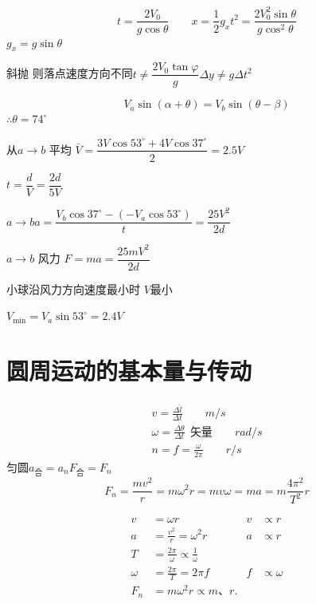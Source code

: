 \[ t=\frac{2V_0}{g\cos\theta}\qquad x=\frac12 g_xt^{2}=\frac{2V_0^{2}\sin\theta}{g\cos^{2}\theta} \]
$g_x=g\sin\theta$

斜抛 则落点速度方向不同\quad $t\neq\dfrac{2V_0\tan\varphi}{g}$\quad $\Delta y\neq g\Delta t^2$


\[
V_a\sin(\alpha+\theta)=V_b\sin(\theta-\beta)
\]
$\therefore\theta=74^\circ$

从$a\to b$ 平均 $\bar V=\dfrac{3V\cos53^\circ+4V\cos37^\circ}{2}=2.5V$

$t=\dfrac{d}{V}=\dfrac{2d}{5V}$ %

$a\to b$\quad $a=\dfrac{V_b\cos37^\circ-(-V_a\cos53^\circ)}{t}=\dfrac{25V^2}{2d}$ %

$a\to b$ 风力 $F=ma=\dfrac{25mV^2}{2d}$

小球沿风力方向速度最小时 $V$最小 %

$V_{\min}=V_a\sin53^\circ=2.4V$


\section{圆周运动的基本量与传动}
\begin{gather*}
v=\frac{\Delta\widehat{l}}{\Delta t}\qquad \unit{m/s}\\
\omega=\frac{\Delta\theta}{\Delta t}\ \ \text{矢量}\qquad \unit{rad/s}\\
n=f=\frac{\omega}{2\pi}\qquad \unit{r/s}
\end{gather*}
匀圆\quad $a_{\text{合}}=a_n$\quad $F_{\text{合}}=F_n$
\[ F_n=\frac{mv^2}{r}=m\omega^2 r=mv\omega=ma=m\frac{4\pi^2}{T^2}r \]

\begin{align*}
v&=\omega r & v&\propto r\\
a&=\frac{v^2}{r}=\omega^2 r & a&\propto r\\
T&=\frac{2\pi}{\omega}\propto\frac{1}{\omega}\\
\omega&=\frac{2\pi}{T}=2\pi f & f&\propto\omega\\
F_n&=m\omega^2 r\propto m\text{、}r.
\end{align*}

